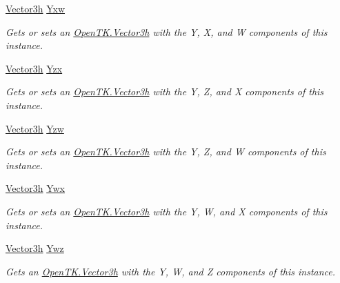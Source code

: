 \begin{DoxyCompactItemize}
\hyperlink{struct_open_t_k_1_1_vector3h}{Vector3h} \hyperlink{struct_open_t_k_1_1_vector4h_a2ddc2afb5327c10e041e1bb2c7fada6d}{Yxw}
\begin{DoxyCompactList}\small\item\em Gets or sets an \hyperlink{struct_open_t_k_1_1_vector3h}{Open\-T\-K.\-Vector3h} with the Y, X, and W components of this instance. \end{DoxyCompactList}\item 
\hyperlink{struct_open_t_k_1_1_vector3h}{Vector3h} \hyperlink{struct_open_t_k_1_1_vector4h_a22da4d4a54c0d882aac3dc3fdae4172c}{Yzx}
\begin{DoxyCompactList}\small\item\em Gets or sets an \hyperlink{struct_open_t_k_1_1_vector3h}{Open\-T\-K.\-Vector3h} with the Y, Z, and X components of this instance. \end{DoxyCompactList}\item 
\hyperlink{struct_open_t_k_1_1_vector3h}{Vector3h} \hyperlink{struct_open_t_k_1_1_vector4h_ad18605f12dd6c1988a40b93128e2284b}{Yzw}
\begin{DoxyCompactList}\small\item\em Gets or sets an \hyperlink{struct_open_t_k_1_1_vector3h}{Open\-T\-K.\-Vector3h} with the Y, Z, and W components of this instance. \end{DoxyCompactList}\item 
\hyperlink{struct_open_t_k_1_1_vector3h}{Vector3h} \hyperlink{struct_open_t_k_1_1_vector4h_a730d6871722d88313025c4d61d5c1497}{Ywx}
\begin{DoxyCompactList}\small\item\em Gets or sets an \hyperlink{struct_open_t_k_1_1_vector3h}{Open\-T\-K.\-Vector3h} with the Y, W, and X components of this instance. \end{DoxyCompactList}\item 
\hyperlink{struct_open_t_k_1_1_vector3h}{Vector3h} \hyperlink{struct_open_t_k_1_1_vector4h_af44b621e1b6ad109eded7daaf4059e7a}{Ywz}
\begin{DoxyCompactList}\small\item\em Gets an \hyperlink{struct_open_t_k_1_1_vector3h}{Open\-T\-K.\-Vector3h} with the Y, W, and Z components of this instance. \end{DoxyCompactList}\item 

\end{DoxyCompactItemize}
